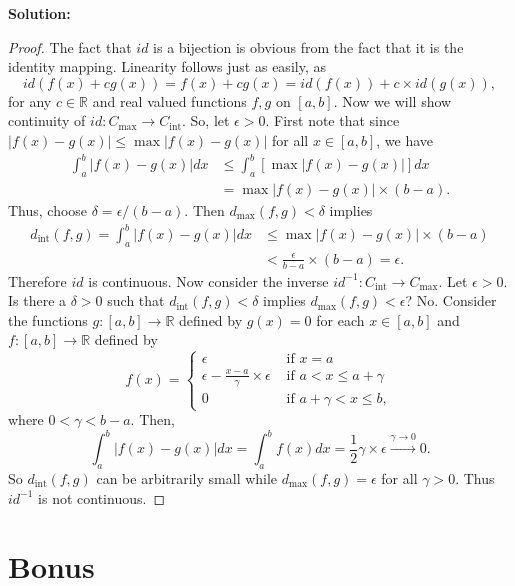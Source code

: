 \documentclass[12pt]{article}
\begin{document}
{\bf Solution:}

\begin{proof}
  The fact that $id$ is a bijection is obvious from the fact that it is the
  identity mapping. Linearity follows just as easily, as 
  \[ id(f(x) + cg(x)) = f(x) + cg(x) = id(f(x)) + c\times id(g(x)), \]
  for any $c \in \mathbb{R}$ and real valued functions $f,g$ on $[a,b]$. Now we
  will show continuity of $id : C_{\max}\rightarrow C_{\text{int}}$. So, let
  $\epsilon > 0$. First note that since $|f(x) - g(x)| \leq \max|f(x) - g(x)|$
  for all $x \in [a,b]$, we have 
  \begin{align*}
    \int_{a}^{b}|f(x) - g(x)| dx & \leq \int_{a}^{b}[\max|f(x) - g(x)|]dx \\
    & = \max |f(x) - g(x)|\times(b-a).
  \end{align*}
  Thus, choose $\delta = \epsilon / (b-a)$. Then $d_{\max}(f,g) < \delta$ implies 
  \begin{align*}
    d_{\text{int}}(f,g) = \int_{a}^{b}|f(x) - g(x)|dx & \leq \max|f(x) - g(x)|
    \times (b-a) \\
    & < \frac{\epsilon}{b-a} \times (b-a) = \epsilon.
  \end{align*}
  Therefore $id$ is continuous. Now consider the inverse
  $id^{-1}:C_{\text{int}}\rightarrow C_{\max}$. Let $\epsilon > 0$. Is there a
  $\delta > 0$ such that $d_{\text{int}}(f,g) < \delta$ implies $d_{\max}(f,g) <
  \epsilon$? No. Consider the functions $g : [a,b] \rightarrow
  \mathbb{R}$ defined by $g(x) = 0$ for each $x \in [a,b]$ and $f : [a,b]
  \rightarrow \mathbb{R}$ defined by 
  \[ f(x) = \left\{ \begin{array}{cl}
      \epsilon & \text{ if } x = a \\
      \epsilon - \frac{x-a}{\gamma}\times \epsilon & \text{ if }a < x \leq a +
      \gamma \\
      0 & \text{ if } a + \gamma < x \leq b,
  \end{array} \right. \]
  where $0 < \gamma < b - a$. Then,
  \[ \int_{a}^{b}|f(x) - g(x)|dx = \int_{a}^{b}f(x)dx = \frac{1}{2}\gamma\times
  \epsilon \stackrel{\gamma\rightarrow 0}{\longrightarrow} 0. \]
  So $d_{\text{int}}(f,g)$ can be arbitrarily small while $d_{\max}(f,g) =
  \epsilon$ for all $\gamma > 0$. Thus $id^{-1}$ is not continuous.
\end{proof}

\newpage

\section*{Bonus}
\end{document}
